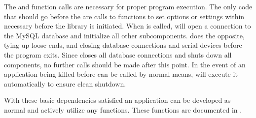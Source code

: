 The  and
 function calls are necessary
for proper program execution. The only code that should go before the
 are calls to functions to set
options or settings within \libseawolf{} necessary before the library is
initiated. When  is called,
\libseawolf{} will open a connection to the MySQL database and initialize all
other subcomponents.  does
the opposite, tying up loose ends, and closing database connections and serial
devices before the program exits. Since
 closes all database
connections and shuts down all \libseawolf{} components, no further
\libseawolf{} calls should be made after this point. In the event of an
application being killed before
 can be called by normal
means, \libseawolf{} will execute it automatically to ensure clean shutdown.

With these basic dependencies satisfied an application can be developed as
normal and actively utilize any \libseawolf{} functions. These functions are
documented in .
